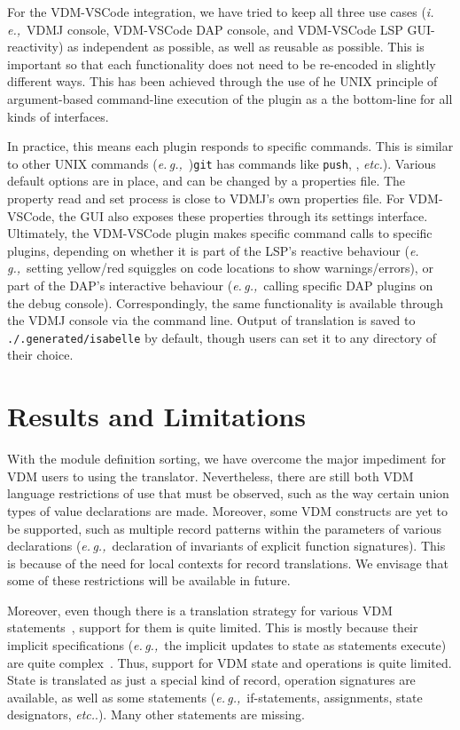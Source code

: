 \documentclass[runningheads,a4paper]{llncs}
\newcommand{\eg}{{\em e.\,g.,\/}}
\newcommand{\ie}{{\em i.\,e.,\/}}
\newcommand{\etc}{{\em etc.\/}}
\begin{document}
For the VDM-VSCode integration, we have tried to keep all three use cases (\ie~VDMJ console, VDM-VSCode DAP console, and VDM-VSCode LSP GUI-reactivity) as independent as possible, as well as reusable as possible. This is important so that each functionality does not need to be re-encoded in slightly different ways. This has been achieved through the use of he UNIX principle of argument-based command-line execution of the plugin as a the bottom-line for all kinds of interfaces. 

In practice, this means each plugin responds to specific commands. This is similar to other UNIX commands (\eg~)\texttt{git} has commands like \texttt{push}, , \etc). Various default options are in place, and can be changed by a properties file. The property read and set process is close to VDMJ's own properties file. For VDM-VSCode, the GUI also exposes these properties through its settings interface. Ultimately, the VDM-VSCode plugin makes specific command calls to specific plugins, depending on whether it is part of the LSP's reactive behaviour  (\eg~setting yellow/red squiggles on code locations to show warnings/errors), or part of the DAP's interactive behaviour (\eg~calling specific DAP plugins on the debug console). Correspondingly, the same functionality is available through the VDMJ console via the command line. Output of translation is saved to \texttt{./.generated/isabelle} by default, though users can set it to any directory of their choice. 

\section{Results and Limitations}\label{sec:Examples}

With the module definition sorting, we have overcome the major impediment for VDM users to using the translator. Nevertheless, there are still both VDM language restrictions of use that must be observed, such as the way certain union types of value declarations are made. Moreover, some VDM constructs are yet to be supported, such as multiple record patterns within the parameters of various declarations (\eg~declaration of invariants of explicit function signatures). This is because of the need for local contexts for record translations. We envisage that some of these restrictions will be available in future. 

Moreover, even though there is a translation strategy for various VDM statements~\cite{NimFull}, support for them is quite limited. This is mostly because their implicit specifications (\eg~the implicit updates to state as statements execute) are quite complex~\cite{PJPhD}. Thus, support for VDM state and operations is quite limited. State is translated as just a special kind of record, operation signatures are available, as well as some statements (\eg~if-statements, assignments, state designators, \etc.). Many other statements are missing.      
\end{document}
